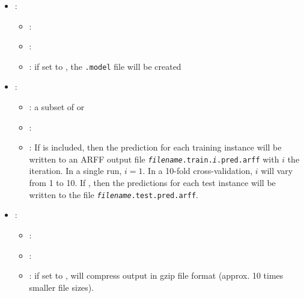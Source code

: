 \begin{itemize}
\begin{itemize}
                \item \optionDescrption{}: ???
           \end{itemize}
    \item {}:
           \begin{itemize}
                \item \optionPossibleValues{}: 
                \item \optionDefaultValue{}: 
                \item \optionDescrption{}: if set to , the \texttt{.model} file will be created
           \end{itemize}
    \item {}:
           \begin{itemize}
                \item \optionPossibleValues{}: a subset of  or 
                \item \optionDefaultValue{}: 
                \item \optionDescrption{}: If  is included, then the prediction for each training instance will be written to an ARFF output file {\tt {\em filename}.train.{\em i}.pred.arff} with $i$ the iteration. In a single run, $i = 1$. In a 10-fold cross-validation, $i$ will vary from 1 to 10. If , then the predictions for each test instance will be written to the file
                {\tt {\em filename}.test.pred.arff}.
           \end{itemize}
    \item {}:
           \begin{itemize}
                \item \optionPossibleValues{}: 
                \item \optionDefaultValue{}: 
                \item \optionDescrption{}:  if set to , \clus{} will compress output in gzip file format (approx. 10 times smaller file sizes).
           \end{itemize}
\end{itemize}
